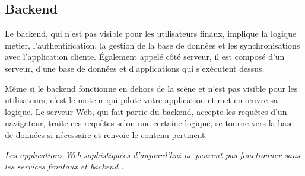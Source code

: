         \subsection{Backend}
        Le backend, qui n'est pas visible pour les utilisateurs finaux, implique la logique métier, 
        l'authentification, la gestion de la base de données et les synchronisations avec 
        l'application cliente. Également appelé côté serveur, il est composé d'un serveur, d'une base 
        de données et d'applications qui s'exécutent dessus.
        \par 
        Même si le backend fonctionne en dehors de la scène et n'est pas visible pour les utilisateurs, 
        c'est le moteur qui pilote votre application et met en œuvre sa logique. Le serveur Web, qui 
        fait partie du backend, accepte les requêtes d'un navigateur, traite ces requêtes selon une 
        certaine logique, se tourne vers la base de données si nécessaire et renvoie le contenu pertinent. 
        \par 
        \textit{Les applications Web sophistiquées d'aujourd'hui ne peuvent pas fonctionner sans
         les services frontaux et backend \cite{abdullah2014frontend}.}

